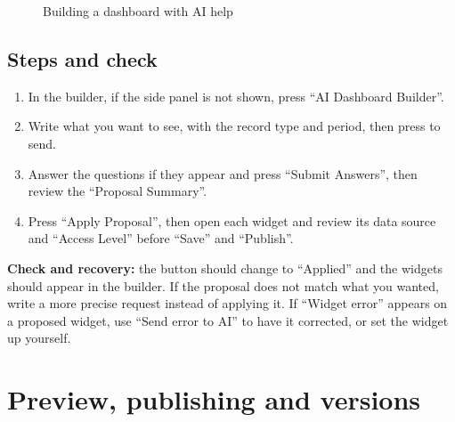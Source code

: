 \begin{figure}[H]
\centering
{}
\rclegend
\caption{Building a dashboard with AI help}
\label{fig:builder-dashboards-ai-builder-flow}
\end{figure}

\subsection{Steps and check}
\begin{enumerate}
\item In the builder, if the side panel is not shown, press “AI Dashboard Builder”.
\item Write what you want to see, with the record type and period, then press  to send.
\item Answer the questions if they appear and press “Submit Answers”, then review the “Proposal Summary”.
\item Press “Apply Proposal”, then open each widget and review its data source and “Access Level” before “Save” and “Publish”.
\end{enumerate}

\textbf{Check and recovery:} the button should change to “Applied” and the widgets should appear in the builder. If the proposal does not match what you wanted, write a more precise request instead of applying it. If “Widget error” appears on a proposed widget, use “Send error to AI” to have it corrected, or set the widget up yourself.

\clearpage
\section{Preview, publishing and versions}
\label{sec:builder-feature-dashboards-publish}

